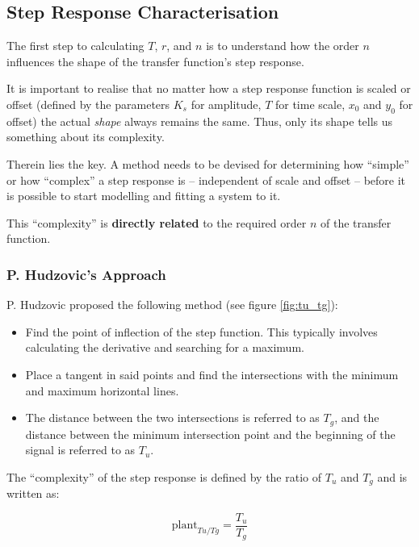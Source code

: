 \subsection{Step Response Characterisation}

The first step to calculating $T$, $r$, and $n$ is to  understand  how the order
$n$ influences the shape of the transfer function's step response.

It is important to realise that no matter how a step response function is scaled
or  offset  (defined  by the parameters $K_s$ for amplitude, $T$ for time scale,
$x_0$ and $y_0$ for offset) the actual \textit{shape}  always  remains the same.
Thus, only its shape tells us something about its complexity.

Therein  lies  the  key. A method  needs  to  be  devised  for  determining  how
``simple''  or  how ``complex'' a step response is -- independent of  scale  and
offset -- before  it  is possible to start modelling and fitting a system to it.

This ``complexity'' is \textbf{directly related}  to  the  required order $n$ of
the transfer function.


\subsubsection*{P. Hudzovic's Approach}

P. Hudzovic proposed the following method (see figure \ref{fig:tu_tg}):

\begin{itemize}
    \item
Find  the  point  of  inflection of the step function. This  typically  involves
calculating the derivative and searching for a maximum.
    \item
Place a tangent in said points and find the intersections  with  the minimum and
maximum horizontal lines.
    \item
The distance between the two intersections  is  referred  to  as  $T_g$, and the
distance between  the minimum intersection point and the beginning of the signal
is referred to as $T_u$.
\end{itemize}

The ``complexity'' of the  step  response  is  defined by the ratio of $T_u$ and
$T_g$ and is written as:

\begin{equation}
    \textrm{plant}_{Tu/Tg} = \frac{T_u}{T_g}
    \label{eq:tu_tg}
\end{equation}


